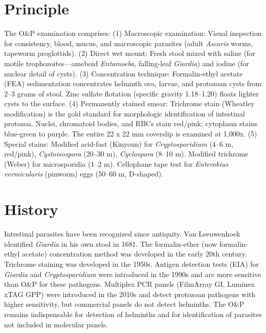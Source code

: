 \section*{Principle}
The O\&P examination comprises: (1) Macroscopic examination: Visual inspection for consistency, blood, mucus, and macroscopic parasites (adult \textit{Ascaris} worms, tapeworm proglottids). (2) Direct wet mount: Fresh stool mixed with saline (for motile trophozoites---ameboid \textit{Entamoeba}, falling-leaf \textit{Giardia}) and iodine (for nuclear detail of cysts). (3) Concentration technique: Formalin-ethyl acetate (FEA) sedimentation concentrates helminth ova, larvae, and protozoan cysts from 2--3 grams of stool. Zinc sulfate flotation (specific gravity 1.18--1.20) floats lighter cysts to the surface. (4) Permanently stained smear: Trichrome stain (Wheatley modification) is the gold standard for morphologic identification of intestinal protozoa. Nuclei, chromatoid bodies, and RBCs stain red/pink; cytoplasm stains blue-green to purple. The entire 22 x 22 mm coverslip is examined at 1,000x. (5) Special stains: Modified acid-fast (Kinyoun) for \textit{Cryptosporidium} (4--6 \textmu m, red/pink), \textit{Cystoisospora} (20--30 \textmu m), \textit{Cyclospora} (8--10 \textmu m). Modified trichrome (Weber) for microsporidia (1--2 \textmu m). Cellophane tape test for \textit{Enterobius vermicularis} (pinworm) eggs (50--60 \textmu m, D-shaped).

\section*{History}
Intestinal parasites have been recognized since antiquity. Van Leeuwenhoek identified \textit{Giardia} in his own stool in 1681. The formalin-ether (now formalin-ethyl acetate) concentration method was developed in the early 20th century. Trichrome staining was developed in the 1950s. Antigen detection tests (EIA) for \textit{Giardia} and \textit{Cryptosporidium} were introduced in the 1990s and are more sensitive than O\&P for these pathogens. Multiplex PCR panels (FilmArray GI, Luminex xTAG GPP) were introduced in the 2010s and detect protozoan pathogens with higher sensitivity, but commercial panels do not detect helminths. The O\&P remains indispensable for detection of helminths and for identification of parasites not included in molecular panels.

